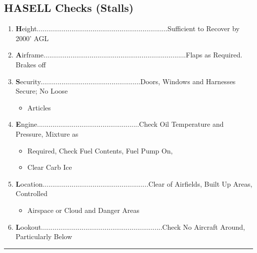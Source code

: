 \documentclass[a4paper]{article}
\newenvironment{checklist}{
  \begin{itemize}[leftmargin=*, align=left]
    \setlength{\itemsep}{2pt}
    \setlength{\parskip}{0pt}
    \setlength{\parsep}{0pt}
}{
  \end{itemize}
}
\newenvironment{numberedchecklist}{
  \begin{enumerate}[label=\arabic*., leftmargin=*, align=left]
    \setlength{\itemsep}{2pt}
    \setlength{\parskip}{0pt}
    \setlength{\parsep}{0pt}
}{
  \end{enumerate}
}
\begin{document}
\subsection*{HASELL Checks (Stalls)}
\begin{numberedchecklist}
\item \textbf{H}eight....................................................................Sufficient to Recover by 2000’ AGL
\item \textbf{A}irframe..........................................................................Flaps as Required. Brakes off
\item \textbf{S}ecurity....................................................Doors, Windows and Harnesses Secure; No Loose
  \begin{checklist}
  \item Articles
  \end{checklist}
\item \textbf{E}ngine.....................................................Check Oil Temperature and Pressure, Mixture as
  \begin{checklist}
  \item Required, Check Fuel Contents, Fuel Pump On,
  \item Clear Carb Ice
  \end{checklist}
\item \textbf{L}ocation.......................................................Clear of Airfields, Built Up Areas, Controlled
  \begin{checklist}
  \item Airspace or Cloud and Danger Areas
  \end{checklist}
\item \textbf{L}ookout...............................................................Check No Aircraft Around, Particularly Below
\end{numberedchecklist}

\rule{\linewidth}{0.4pt}
\end{document}
